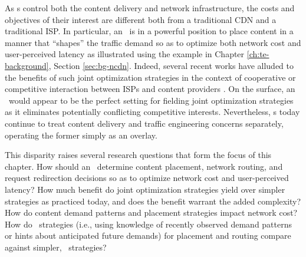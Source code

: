 As \ncp s control both the content delivery and network infrastructure, the costs and objectives of their interest are different both from a traditional CDN and a traditional ISP. In particular, an \ncp\ is in a powerful position to place content in a manner that ``shapes'' the traffic demand so as to optimize both network cost and user-perceived latency as illustrated using the example in Chapter \ref{ch:te-background}, Section \ref{sec:bg-ncdn}. Indeed, several recent works have alluded to the benefits of such joint optimization strategies in the context of cooperative or competitive interaction between ISPs and content providers \cite{P4P,JohariGameTheory,Jiang2009,catenew}. On the surface, an \ncp\ would appear to be the perfect setting for fielding joint optimization strategies as it eliminates potentially conflicting competitive interests. Nevertheless, \ncp s today continue to treat content delivery and traffic engineering concerns separately, operating the former simply as an overlay.

This disparity raises several research questions that form the focus of this chapter. How should an \ncp\ determine content placement, network routing, and request redirection decisions so as to optimize network cost and user-perceived latency? How much benefit do joint optimization strategies yield over simpler strategies as practiced today, and does the benefit warrant the added complexity?  How do content demand patterns and placement strategies impact network cost?  How do \planned\ strategies (i.e., using knowledge of recently observed demand patterns or hints about anticipated future demands) for placement and routing compare against simpler, \unplanned\ strategies?

